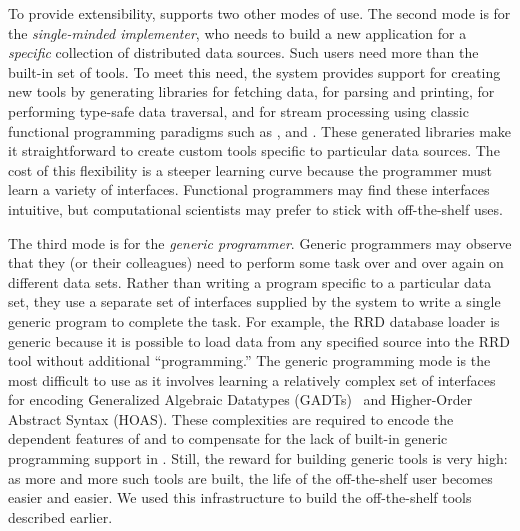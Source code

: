 To provide extensibility, \padsd{} supports two other
modes of use. 
The second mode is
for the {\em single-minded implementer}, who needs to build a new
application for a {\em specific} collection of distributed data
sources.  Such users need more than the built-in set of tools. To meet
this need, the system provides support for
creating new tools by generating libraries for fetching
data, for parsing and printing, for performing type-safe data
traversal, and for stream processing using classic functional
programming paradigms such as ,  and .
These generated libraries make it straightforward to create custom tools
specific to particular data sources.  The cost of this flexibility is
a steeper learning curve because the programmer must learn a variety
of interfaces. Functional programmers may find
these interfaces intuitive, but computational scientists
may prefer to stick with off-the-shelf uses. 

The third mode is for the {\em generic programmer}.  Generic
programmers may observe that they (or their colleagues) 
need to perform some task over and over again on different
data sets.  Rather than writing a program specific to a particular
data set, they use a 
separate set of interfaces supplied by the \padsd{} system to write a
single generic program to complete the task.  For example, the RRD database
loader is generic because it is possible to load data from any
specified source into the RRD tool without additional ``programming.''
The generic programming mode is the most difficult to use as it involves
learning a relatively complex set of interfaces for encoding
Generalized Algebraic Datatypes (GADTs)~\cite{xi:popl03} 
and Higher-Order Abstract Syntax (HOAS). 
These complexities are required to encode 
the dependent features of \padsd{} and to compensate for the lack of
built-in generic programming support in \ocaml{}. 
Still, the reward for building generic tools is very high:
as more and more such tools are built, the life of the off-the-shelf
user becomes easier and easier.  We used this infrastructure to
build the off-the-shelf tools described earlier.



